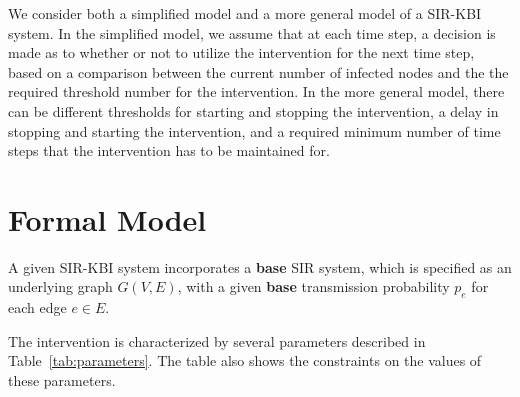 \documentclass[11pt]{article}
\begin{document}
 We consider both a simplified model and a more general model of a SIR-KBI system.
 In the simplified model, we assume that at each time step, 
  a decision is made as to whether or not to utilize the  intervention for the next time step,
  based on a comparison between the current number of infected nodes
   and the the required threshold number for the intervention.
  In the more general model, 
  there can be different thresholds for starting and stopping the intervention,
  a delay in stopping and starting the intervention,
  and a required minimum number of time steps that the intervention has to be maintained for.
  
  

 

\section{Formal Model}
\label{sec:formal_model}



A given SIR-KBI system incorporates a {\bf base} SIR system,
which is specified as an underlying graph $G(V,E)$, with
a given {\bf base} transmission probability $p_e$ for each edge $e \in E$. 
 
The intervention is characterized by several parameters described in
Table~\ref{tab:parameters}.
The table also shows the constraints on the values of 
these parameters.

\smallskip
\end{document}
